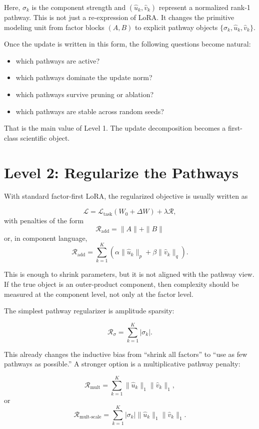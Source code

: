 \documentclass[11pt]{article}
\begin{document}
Here, $\sigma_k$ is the component strength and $(\hat{u}_k,\hat{v}_k)$ represent a normalized rank-1 pathway. This is not just a re-expression of LoRA. It changes the primitive modeling unit from factor blocks $(A,B)$ to explicit pathway objects $\{\sigma_k,\hat{u}_k,\hat{v}_k\}$.

Once the update is written in this form, the following questions become natural:

\begin{itemize}
\item which pathways are active?
\item which pathways dominate the update norm?
\item which pathways survive pruning or ablation?
\item which pathways are stable across random seeds?
\end{itemize}

That is the main value of Level 1. The update decomposition becomes a first-class scientific object.

\section{Level 2: Regularize the Pathways}

With standard factor-first LoRA, the regularized objective is usually written as

\[
\mathcal{L}
=
\mathcal{L}_{\text{task}}(W_0+\Delta W)
+ \lambda \mathcal{R},
\]
with penalties of the form
\[
\mathcal{R}_{\text{add}}
=
\|A\| + \|B\|
\]
or, in component language,
\[
\mathcal{R}_{\text{add}}
=
\sum_{k=1}^{K}
\left(
\alpha \|\hat{u}_k\|_p + \beta \|\hat{v}_k\|_q
\right).
\]

This is enough to shrink parameters, but it is not aligned with the pathway view. If the true object is an outer-product component, then complexity should be measured at the component level, not only at the factor level.

The simplest pathway regularizer is amplitude sparsity:

\[
\mathcal{R}_{\sigma} = \sum_{k=1}^{K} |\sigma_k|.
\]

This already changes the inductive bias from ``shrink all factors'' to ``use as few pathways as possible.'' A stronger option is a multiplicative pathway penalty:

\[
\mathcal{R}_{\text{mult}}
=
\sum_{k=1}^{K}
\|\hat{u}_k\|_1 \|\hat{v}_k\|_1,
\]
or
\[
\mathcal{R}_{\text{mult-scale}}
=
\sum_{k=1}^{K}
|\sigma_k| \|\hat{u}_k\|_1 \|\hat{v}_k\|_1.
\]
\end{document}
